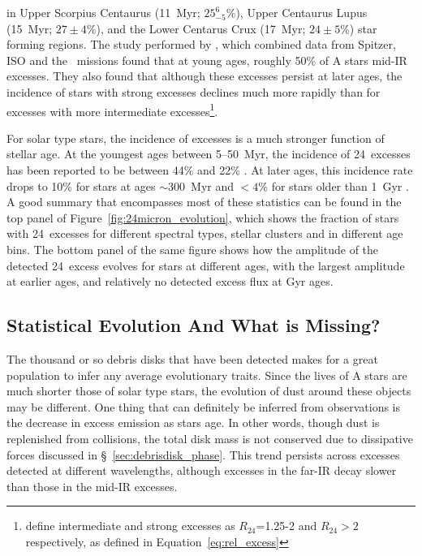 in Upper Scorpius Centaurus (11~Myr; $25^{6}_{-5}$\%), Upper Centaurus Lupus (15~Myr; $27 \pm 4$\%), and the Lower Centarus Crux (17~Myr; $24 \pm 5$\%) star forming regions. The study performed by \citet{Rieke2005}, which combined data from Spitzer, ISO and the \iras\ missions found that at young ages, roughly 50\% of A stars mid-IR excesses. They also found that although these excesses persist at later ages, the incidence of stars with strong excesses declines much more rapidly than for excesses with more intermediate excesses\footnote{\citet{Rieke2005} define intermediate and strong excesses as $R_{24}$=1.25-2 and $R_{24}>2$ respectively, as defined in Equation~\ref{eq:rel_excess}}.

   For solar type stars, the incidence of excesses is a much stronger function of stellar age. At the youngest ages between 5--50~Myr, the incidence of 24\micron\ excesses has been reported to be between 44\% and 22\% \citep{Siegler2007, Chen2012}. At later ages, this incidence rate drops to 10\% for stars at ages $\sim$300~Myr \citep{Meyer2008} and $<4$\% for stars older than 1~Gyr \citep{Trilling2008}. A good summary that encompasses most of these statistics can be found in the top panel of Figure~\ref{fig:24micron_evolution}, which shows the fraction of stars with 24\micron\ excesses for different spectral types, stellar clusters and in different age bins. The bottom panel of the same figure shows how the amplitude of the detected 24\micron\ excess evolves for stars at different ages, with the largest amplitude at earlier ages, and relatively no detected excess flux at Gyr ages.
   

    
\subsection{Statistical Evolution And What is Missing?}
    
    The thousand or so debris disks that have been detected makes for a great population to infer any average evolutionary traits. Since the lives of A stars are much shorter those of solar type stars, the evolution of dust around these objects may be different. One thing that can definitely be inferred from observations is the decrease in excess emission as stars age. In other words, though dust is replenished from collisions, the total disk mass is not conserved due to dissipative forces discussed in \S~\ref{sec:debrisdisk_phase}. This trend persists across excesses detected at different wavelengths, although excesses in the far-IR decay slower than those in the mid-IR excesses. 
    
